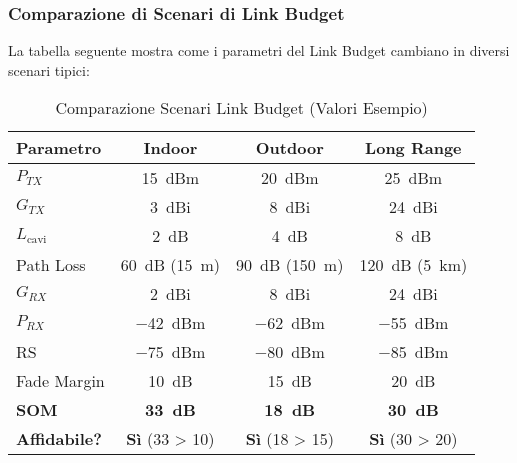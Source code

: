 \begin{center}
\end{center}

\subsubsection{Comparazione di Scenari di Link Budget}
La tabella seguente mostra come i parametri del Link Budget cambiano in diversi scenari tipici:

\begin{table}[H]
\centering
\begin{tabular}{|l|c|c|c|}
    \hline
    \textbf{Parametro} & \textbf{Indoor} & \textbf{Outdoor} & \textbf{Long Range} \\
\hline
$P_{TX}$ & \SI{15}{dBm} & \SI{20}{dBm} & \SI{25}{dBm} \\
$G_{TX}$ & \SI{3}{dBi} & \SI{8}{dBi} & \SI{24}{dBi} \\
$L_{\text{cavi}}$ & \SI{2}{dB} & \SI{4}{dB} & \SI{8}{dB} \\
Path Loss & \SI{60}{dB} (\SI{15}{m}) & \SI{90}{dB} (\SI{150}{m}) & \SI{120}{dB} (\SI{5}{km}) \\
$G_{RX}$ & \SI{2}{dBi} & \SI{8}{dBi} & \SI{24}{dBi} \\
\hline
$P_{RX}$ & \SI{-42}{dBm} & \SI{-62}{dBm} & \SI{-55}{dBm} \\
\hline
RS & \SI{-75}{dBm} & \SI{-80}{dBm} & \SI{-85}{dBm} \\
Fade Margin & \SI{10}{dB} & \SI{15}{dB} & \SI{20}{dB} \\
\hline
\textbf{SOM} & \textbf{\SI{33}{dB}} & \textbf{\SI{18}{dB}} & \textbf{\SI{30}{dB}} \\
\textbf{Affidabile?} & \textbf{Sì} (33 > 10) & \textbf{Sì} (18 > 15) & \textbf{Sì} (30 > 20) \\
\hline
\end{tabular}
\label{tab:link_budget_scenarios}
\caption{Comparazione Scenari Link Budget (Valori Esempio)}
\end{table}


